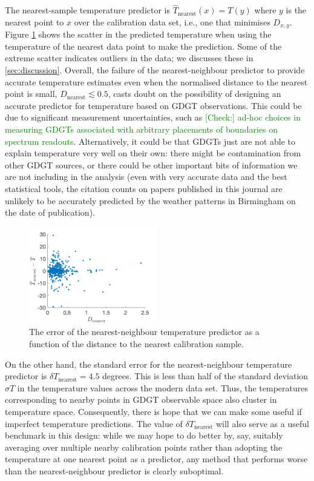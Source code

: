 \documentclass[rmp,aps,twocolumn]{revtex4-1}
\newcommand{\tocheck}[1]{\textcolor{green}{[Check:] #1}}
\begin{document}
The nearest-sample temperature predictor is $\hat{T}_\textrm{nearest} (x) = T(y)$ where $y$ is the nearest point to $x$ over the calibration data set, i.e., one that minimises $D_{x,y}$.  Figure \ref{fig:Tnearest} shows the scatter in the predicted temperature when using the temperature of the nearest data point to make the prediction.  Some of the extreme scatter indicates outliers in the data; we discusses these in \autoref{sec:discussion}.  Overall, the failure of the nearest-neighbour predictor to provide accurate temperature estimates even when the normalised distance to the nearest point is small, $D_\mathrm{nearest} \lesssim 0.5$, casts doubt on the possibility of designing an accurate predictor for temperature based on GDGT observations.  This could be due to significant measurement uncertainties, such as \tocheck{ad-hoc choices in measuring GDGTs associated with arbitrary placements of boundaries on spectrum readouts}.  Alternatively, it could be that GDGTs just are not able to explain temperature very well on their own: there might be contamination from other GDGT sources, or there could be other important bits of information we are not including in the analysis (even with very accurate data and the best statistical tools, the citation counts on papers published in this journal are unlikely to be accurately predicted by the weather patterns in Birmingham on the date of publication).   

\begin{figure}
	\centering
	\includegraphics[width=0.5\textwidth]{Tnearest.png}
	\caption{\label{fig:Tnearest}  The error of the nearest-neighbour temperature predictor as a function of the distance to the nearest calibration sample.}
\end{figure}

On the other hand, the standard error for the nearest-neighbour temperature predictor is $\delta T_\mathrm{nearest} = 4.5$ degrees.  This is less than half of the standard deviation $\sigma T$ in the temperature values across the modern data set. Thus, the temperatures corresponding to nearby points in GDGT observable space also cluster in temperature space.  Consequently, there is hope that we can make some useful if imperfect temperature predictions.  The value of $\delta T_\mathrm{nearest}$ will also serve as a useful benchmark in this design: while we may hope to do better by, say, suitably averaging over multiple nearby calibration points rather than adopting the temperature at one nearest point as a predictor, any method that performs worse than the nearest-neighbour predictor is clearly suboptimal. 
\end{document}
